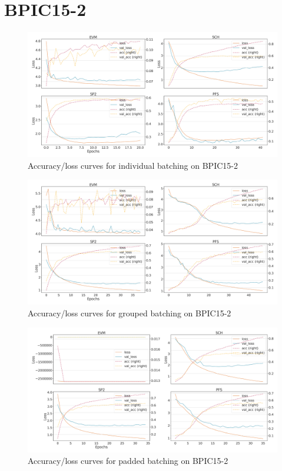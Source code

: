 \section*{BPIC15-2}
\begin{figure}[!htb]
    \centering
    \includegraphics[width=\textwidth]{gfx/bpic2015_2/individual_loss_acc_curve.png}
    \caption{Accuracy/loss curves for individual batching on BPIC15-2}
\end{figure}
\begin{figure}[!htb]
    \centering
    \includegraphics[width=\textwidth]{gfx/bpic2015_2/grouped_loss_acc_curve.png}
    \caption{Accuracy/loss curves for grouped batching on BPIC15-2}
\end{figure}
\begin{figure}[!htb]
    \centering
    \includegraphics[width=\textwidth]{gfx/bpic2015_2/padded_loss_acc_curve.png}
    \caption{Accuracy/loss curves for padded batching on BPIC15-2}
\end{figure}
